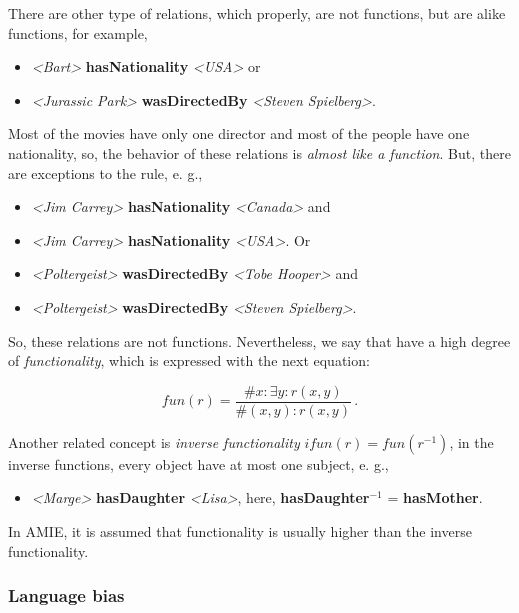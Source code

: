 \documentclass{article}
\newcommand{\triple}[3]{{\itshape\textless#1\textgreater} {\bfseries#2} {\itshape\textless#3\textgreater}}
\begin{document}
There are other type of relations, which properly, are not functions, but are
alike functions, for example,

\begin{itemize}
    \item \triple{Bart}{hasNationality}{USA} or
    \item \triple{Jurassic Park}{wasDirectedBy}{Steven Spielberg}.
\end{itemize}

Most of the movies have only one director and most of the people have one
nationality, so, the behavior of these relations is \textit{almost like a
function}. But, there are exceptions to the rule, e. g.,

\begin{itemize}
    \item \triple{Jim Carrey}{hasNationality}{Canada} and
    \item \triple{Jim Carrey}{hasNationality}{USA}. Or
    \item \triple{Poltergeist}{wasDirectedBy}{Tobe Hooper} and
    \item \triple{Poltergeist}{wasDirectedBy}{Steven Spielberg}.
\end{itemize}

So, these relations are not functions. Nevertheless, we say that have a high
degree of \textit{functionality}, which is expressed with the next equation:

\begin{equation} %
    fun(r) = \dfrac{\#x : \exists y : r(x, y)}{\#(x, y) : r(x, y)} \,.
\end{equation}

\noindent Another related concept is \textit{inverse functionality} $ifun(r) =
fun(r^{-1})$, in the inverse functions, every object have at most one subject,
e. g.,

\begin{itemize}
    \item \triple{Marge}{hasDaughter}{Lisa}, here, \textbf{hasDaughter}$^{-1}$ = \textbf{hasMother}.
\end{itemize}

In AMIE, it is assumed that functionality is usually higher than the inverse
functionality.


\subsubsection{Language bias}
\end{document}
